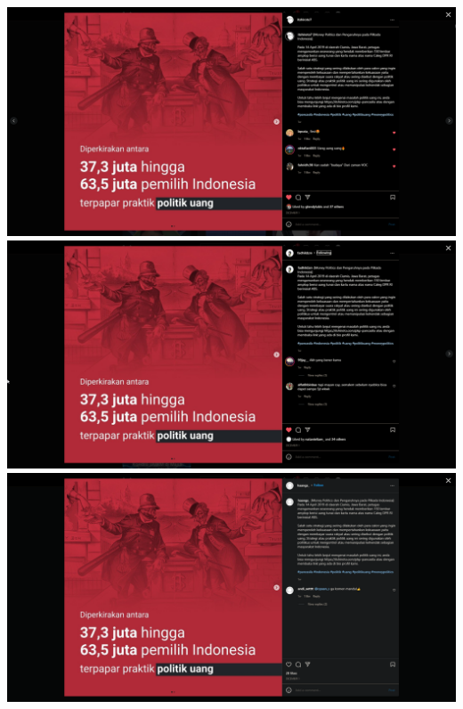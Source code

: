 \documentclass[12pt]{article}
\begin{document}
\begin{minipage}[b]{0.47\textwidth}
    \includegraphics[width=\textwidth,keepaspectratio]{Asset/rivo.png}
    \includegraphics[width=\textwidth,keepaspectratio]{Asset/jaki.png}
    \includegraphics[width=\textwidth,keepaspectratio]{Asset/farhan.png}
\end{minipage}

\pagebreak
\end{document}
